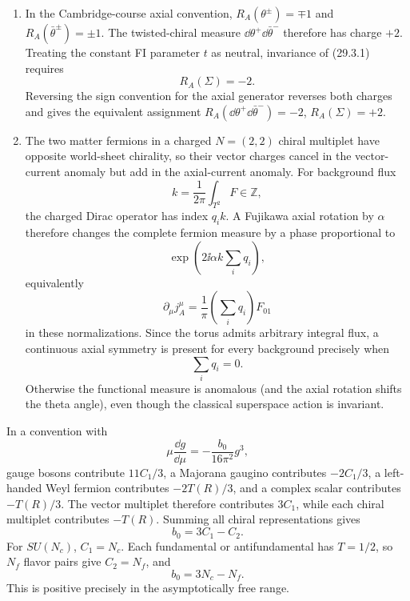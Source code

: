 \begin{enumerate}
\begin{enumerate}
    Define
    \[
      \boxed{\Sigma=\frac1{\sqrt2}\bar D_+D_-V.}
      \tag{29.3.S2}
    \]
    The normalization is conventional.  Its variation contains
    \(\bar D_+D_-\Lambda\), which vanishes because
    \(\bar D_+\Lambda=0\) and \(\{\bar D_+,D_-\}=0\), and
    \(\bar D_+D_-\bar\Lambda=0\), which vanishes because
    \(D_-\bar\Lambda=0\).  Hence \(\Sigma\) is gauge invariant.  Moreover,
    \[
      \bar D_+\Sigma=0,
      \qquad D_-\Sigma=0,
      \tag{29.3.S3}
    \]
    by nilpotence and the same anticommutator.  These are precisely the
    twisted-chiral constraints.

    \item In the Cambridge-course axial convention,
    \(R_A(\theta^\pm)=\mp1\) and
    \(R_A(\bar\theta^\pm)=\pm1\).  The twisted-chiral measure
    \(\dd\theta^+\dd\bar\theta^-\) therefore has charge \(+2\).  Treating the
    constant FI parameter \(t\) as neutral, invariance of (29.3.1) requires
    \[
      \boxed{R_A(\Sigma)=-2.}
      \tag{29.3.S4}
    \]
    Reversing the sign convention for the axial generator reverses both
    charges and gives the equivalent assignment
    \(R_A(\dd\theta^+\dd\bar\theta^-)=-2\), \(R_A(\Sigma)=+2\).

    \item The two matter fermions in a charged \(N=(2,2)\) chiral
    multiplet have opposite world-sheet chirality, so their vector charges
    cancel in the vector-current anomaly but add in the axial-current
    anomaly.  For background flux
    \[
      k=\frac1{2\pi}\int_{T^2}F\in\mathbb Z,
    \]
    the charged Dirac operator has index \(q_i k\).  A Fujikawa axial
    rotation by \(\alpha\) therefore changes the complete fermion measure
    by a phase proportional to
    \[
      \exp\!\left(2\ii\alpha k\sum_iq_i\right),
      \tag{29.3.S5}
    \]
    equivalently
    \[
      \partial_\mu j_A^\mu
        =\frac1\pi\left(\sum_iq_i\right)F_{01}
      \tag{29.3.S6}
    \]
    in these normalizations.  Since the torus admits arbitrary integral
    flux, a continuous axial symmetry is present for every background
    precisely when
    \[
      \boxed{\sum_iq_i=0.}
    \]
    Otherwise the functional measure is anomalous (and the axial rotation
    shifts the theta angle), even though the classical superspace action is
    invariant.
  \end{enumerate}

In a convention with
  \[
    \mu\frac{\dd g}{\dd\mu}=-\frac{b_0}{16\pi^2}g^3,
  \]
  gauge bosons contribute \(11C_1/3\), a Majorana gaugino contributes
  \(-2C_1/3\), a left-handed Weyl fermion contributes
  \(-2T(R)/3\), and a complex scalar contributes \(-T(R)/3\).
  The vector multiplet therefore contributes \(3C_1\), while each
  chiral multiplet contributes \(-T(R)\).  Summing all chiral
  representations gives
  \[
    b_0=3C_1-C_2.
  \]
  For \(SU(N_c)\), \(C_1=N_c\).  Each fundamental or antifundamental has
  \(T=1/2\), so \(N_f\) flavor pairs give \(C_2=N_f\), and
  \[
    b_0=3N_c-N_f.
  \]
  This is positive precisely in the asymptotically free range.


\end{enumerate}
